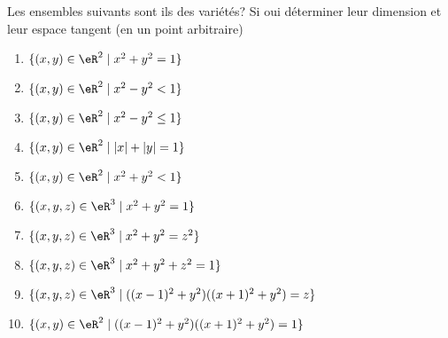
\begin{exercice}\label{exoVariete0001}

Les ensembles suivants sont ils des variétés? Si oui déterminer leur dimension et leur espace tangent (en un point arbitraire)
	\begin{enumerate}
		\item $ \{ (x,y) \in \eR^2 \mid x^2 + y^2 = 1 \} $
		\item $ \{ (x,y) \in \eR^2 \mid x^2 - y^2 <1 \} $
		\item $ \{ (x,y) \in \eR^2 \mid x^2 - y^2  \leq 1 \} $
		\item $ \{ (x,y) \in \eR^2 \mid |x| + |y| = 1 \} $
		\item $ \{ (x,y) \in \eR^2 \mid x^2 + y^2 <1 \} $
		\item $ \{ (x,y,z) \in \eR^3 \mid x^2 + y^2 = 1 \} $
		\item $ \{ (x,y,z) \in \eR^3 \mid x^2 + y^2 = z^2 \} $
		\item $ \{ (x,y,z) \in \eR^3 \mid x^2 + y^2 + z^2 = 1 \} $
		\item $ \{ (x,y,z) \in \eR^3 \mid ((x-1)^2+y^2)((x+1)^2 + y^2) =z \} $
		\item $ \{ (x,y) \in \eR^2 \mid ((x-1)^2+y^2)((x+1)^2 + y^2) =1 \} $
	\end{enumerate}

\end{exercice}
